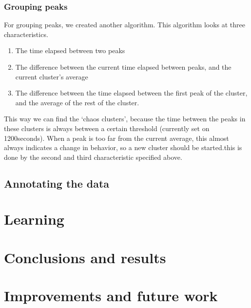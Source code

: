 \documentclass[a4paper, 11pt]{article}
\newcommand{\timeThreshold}{1200}
\begin{document}
 \subsubsection{Grouping peaks}
 For grouping peaks, we created another algorithm. This algorithm looks at three
 characteristics.  
 \begin{enumerate}
 \item The time elapsed between two peaks
 \item The difference between the current time elapsed between peaks, and the
 current cluster's average
 \item The difference between the time elapsed between the first peak of the
 cluster, and the average of the rest of the cluster.
 \end{enumerate}
 This way we can find the `chaos clusters', because the time between the peaks
 in these clusters is always between a certain threshold (currently set on
 \timeThreshold seconds). 
 When a peak is too far from the  current average, this almost always indicates
 a change in behavior, so a new cluster should be started.this is done by the
 second and third characteristic specified above.


 \subsection{Annotating the data}


\section{Learning}

\section{Conclusions and results}

\section{Improvements and future work}
\end{document}
